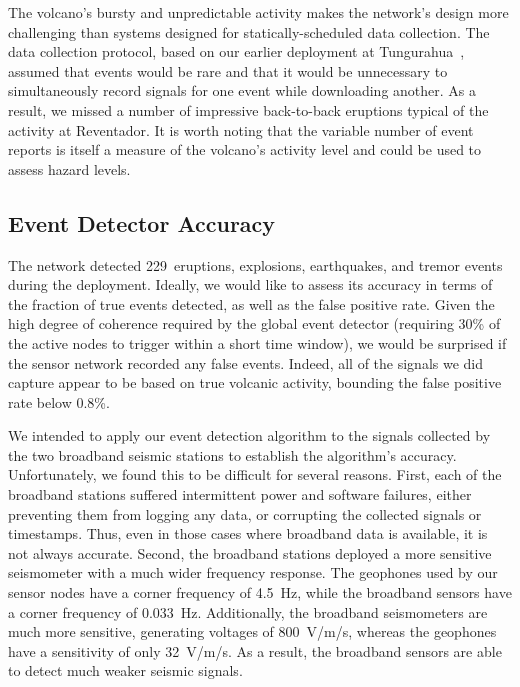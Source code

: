 The volcano's bursty and unpredictable activity makes the network's design
more challenging than systems designed for statically-scheduled data
collection. The data collection protocol, based on our earlier deployment at
Tungurahua~\cite{volcano-ewsn05}, assumed that events would be rare and that
it would be unnecessary to simultaneously record signals for one event while
downloading another. As a result, we missed a number of impressive
back-to-back eruptions typical of the activity at Reventador. It is worth
noting that the variable number of event reports is itself a measure of the
volcano's activity level and could be used to assess hazard levels.

\subsection{Event Detector Accuracy}
\label{sec-eventdetectaccuracy}

The network detected 229~eruptions, explosions, earthquakes, and tremor
events during the deployment. Ideally, we would like to assess its accuracy
in terms of the fraction of true events detected, as well as the false
positive rate. Given the high degree of coherence required by the global
event detector (requiring 30\% of the active nodes to trigger within a short
time window), we would be surprised if the sensor network recorded any false
events. Indeed, all of the signals we did capture appear to be based on true
volcanic activity, bounding the false positive rate below 0.8\%.

We intended to apply our event detection algorithm to the signals collected
by the two broadband seismic stations to establish the algorithm's accuracy.
Unfortunately, we found this to be difficult for several reasons. First, each
of the broadband stations suffered intermittent power and software failures,
either preventing them from logging any data, or corrupting the collected
signals or timestamps. Thus, even in those cases where broadband data is
available, it is not always accurate. Second, the broadband stations deployed
a more sensitive seismometer with a much wider frequency response. The
geophones used by our sensor nodes have a corner frequency of 4.5~Hz, while
the broadband sensors have a corner frequency of 0.033~Hz. Additionally, the
broadband seismometers are much more sensitive, generating voltages of
800~V/m/s, whereas the geophones have a sensitivity of only 32~V/m/s. As a
result, the broadband sensors are able to detect much weaker seismic signals.

